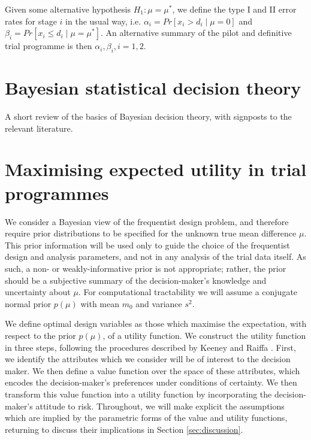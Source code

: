 \documentclass[sagev, Crown]{sagej}
\begin{document}
Given some alternative hypothesis $H_1: \mu =\mu^*$, we define the type I and II error rates for stage $i$ in the usual way, i.e. $\alpha_i = Pr[x_i > d_i \mid \mu = 0]$ and $\beta_i = Pr[x_i \leq d_i \mid \mu = \mu^*]$. An alternative summary of the pilot and definitive trial programme is then  $\alpha_i, \beta_i, i=1,2$.


\section{Bayesian statistical decision theory}\label{sec:bsdt}

A short review of the basics of Bayesian decision theory, with signposts to the relevant literature.

\section{Maximising expected utility in trial programmes}\label{sec:methods}

We consider a Bayesian view of the frequentist design problem, and therefore require prior distributions to be specified for the unknown true mean difference $\mu$. This prior information will be used only to guide the choice of the frequentist design and analysis parameters, and not in any analysis of the trial data itself. As such, a non- or weakly-informative prior is not appropriate; rather, the prior should be a subjective summary of the decision-maker's knowledge and uncertainty about $\mu$. For computational tractability we will assume a conjugate normal prior $p(\mu)$ with mean $m_0$ and variance $s^2$.

We define optimal design variables as those which maximise the expectation, with respect to the prior $p(\mu)$, of a utility function. We construct the utility function in three steps, following the procedures described by Keeney and Raiffa \cite{Keeney1976}. First, we identify the attributes which we consider will be of interest to the decision maker. We then define a value function over the space of these attributes, which encodes the decision-maker's preferences under conditions of certainty. We then transform this value function into a utility function by incorporating the decision-maker's attitude to risk. Throughout, we will make explicit the assumptions which are implied by the parametric forms of the value and utility functions, returning to discuss their implications in Section \ref{sec:discussion}.
\end{document}
